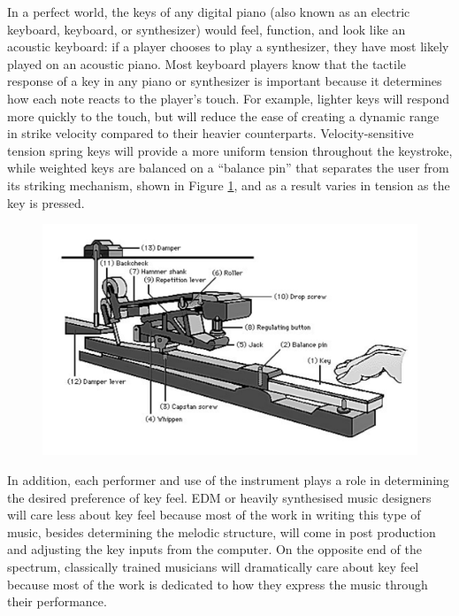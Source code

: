 In a perfect world, the keys of any digital piano (also known as an electric keyboard, keyboard, or synthesizer) would feel, function, and look like an acoustic keyboard: if a player chooses to play a synthesizer, they have most likely played on an acoustic piano. Most keyboard players know that the tactile response of a key in any piano or synthesizer is important because it determines how each note reacts to the player’s touch. For example, lighter keys will respond more quickly to the touch, but will reduce the ease of creating a dynamic range in strike velocity compared to their heavier counterparts. Velocity-sensitive tension spring keys will provide a more uniform tension throughout the keystroke, while weighted keys are balanced on a “balance pin” that separates the user from its striking mechanism, shown in Figure \ref{fig:key_mechanism}, and as a result varies in tension as the key is pressed.

\begin{figure}[h!]
  \centering
  \includegraphics[width=\linewidth]{image/KeyMechanism.png}
  \caption{}
  \label{fig:key_mechanism}
\end{figure}

In addition, each performer and use of the instrument plays a role in determining the desired preference of key feel. EDM or heavily synthesised music designers will care less about key feel because most of the work in writing this type of music, besides determining the melodic structure, will come in post production and adjusting the key inputs from the computer. On the opposite end of the spectrum, classically trained musicians will dramatically care about key feel because most of the work is dedicated to how they express the music through their performance.

